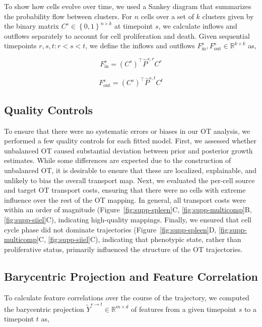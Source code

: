 To show how cells evolve over time, we used a Sankey diagram that summarizes the probability flow between clusters. For \(n\) cells over a set of \(k\) clusters given by the binary matrix \(C^{s} \in \left\{ 0,1 \right\}^{n \times k}\) at timepoint \(s\), we calculate inflows and outflows separately to account for cell proliferation and death. Given sequential timepoints \(r,s,t:r < s < t\), we define the inflows and outflows \(F_{\mathrm{\text{in}}}^{s},F_{\mathrm{\text{out}}}^{s} \in \mathbb{R}^{k \times k}\) as,

\[F_{\mathrm{\text{in}}}^{s} = \left( C^{s} \right)^{\top}{\widehat{P}}^{s,r}C^{r}\]

\[F_{\mathrm{\text{out}}}^{s} = \left( C^{s} \right)^{\top}{\widehat{P}}^{s,t}C^{t}\]

\subsection{Quality Controls}

To ensure that there were no systematic errors or biases in our OT analysis, we performed a few quality controls for each fitted model. First, we assessed whether unbalanced OT caused substantial deviation between prior and posterior growth estimates. While some differences are expected due to the construction of unbalanced OT, it is desirable to ensure that these are localized, explainable, and unlikely to bias the overall transport map. Next, we evaluated the per-cell source and target OT transport costs, ensuring that there were no cells with extreme influence over the rest of the OT mapping. In general, all transport costs were within an order of magnitude (Figure~\ref{fig:supp-spleen}C, \ref{fig:supp-multicomp}B, \ref{fig:supp-siiel}C), indicating high-quality mappings. Finally, we ensured that cell cycle phase did not dominate trajectories (Figure~\ref{fig:supp-spleen}D, \ref{fig:supp-multicomp}C, \ref{fig:supp-siiel}C), indicating that phenotypic state, rather than proliferative status, primarily influenced the structure of the OT trajectories.

\subsection{Barycentric Projection and Feature Correlation}

To calculate feature correlations over the course of the trajectory, we computed the barycentric projection \({\widetilde{Y}}^{s \rightarrow t} \in \mathbb{R}^{m \times d}\) of features from a given timepoint \(s\) to a timepoint \(t\) as,

